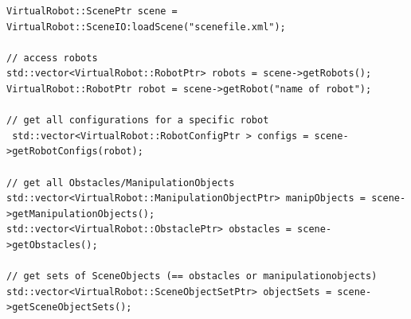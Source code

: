 \documentclass{book}
\begin{document}
\begin{lstlisting}
VirtualRobot::ScenePtr scene = VirtualRobot::SceneIO:loadScene("scenefile.xml");

// access robots
std::vector<VirtualRobot::RobotPtr> robots = scene->getRobots();
VirtualRobot::RobotPtr robot = scene->getRobot("name of robot");

// get all configurations for a specific robot
 std::vector<VirtualRobot::RobotConfigPtr > configs = scene->getRobotConfigs(robot);

// get all Obstacles/ManipulationObjects
std::vector<VirtualRobot::ManipulationObjectPtr> manipObjects = scene->getManipulationObjects();
std::vector<VirtualRobot::ObstaclePtr> obstacles = scene->getObstacles();

// get sets of SceneObjects (== obstacles or manipulationobjects)
std::vector<VirtualRobot::SceneObjectSetPtr> objectSets = scene->getSceneObjectSets();
\end{lstlisting}
\end{document}
